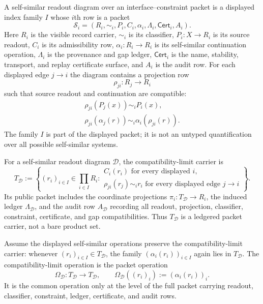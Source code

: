 \begin{definition}
\label{def:self-similar-readout-diagram}
A self-similar readout diagram over an interface--constraint packet is a
displayed index family $I$ whose $i$th row is a packet
$$
\mathcal S_i=(R_i,\sim_i,P_i,C_i,\alpha_i,\Lambda_i,\mathsf{Cert}_i,A_i).
$$
Here $R_i$ is the visible record carrier, $\sim_i$ is its classifier,
$P_i:X\to R_i$ is its source readout, $C_i$ is its admissibility row,
$\alpha_i:R_i\to R_i$ is its self-similar continuation operation,
$\Lambda_i$ is the provenance and gap ledger, $\mathsf{Cert}_i$ is the
name, stability, transport, and replay certificate surface, and $A_i$ is
the audit row. For each displayed edge $j\to i$ the diagram contains a
projection row
$$
\rho_{ji}:R_j\to R_i
$$
such that source readout and continuation are compatible:
$$
\begin{gathered}
\rho_{ji}(P_j(x))\sim_i P_i(x),\\
\rho_{ji}(\alpha_j(r))\sim_i \alpha_i(\rho_{ji}(r)).
\end{gathered}
$$
The family $I$ is part of the displayed packet; it is not an untyped
quantification over all possible self-similar systems.
\end{definition}

\begin{definition}
\label{def:compatibility-limit-carrier}
For a self-similar readout diagram $\mathcal D$, the compatibility-limit
carrier is
$$
T_{\mathcal D}
:=
\left\{(r_i)_{i\in I}\in\prod_{i\in I}R_i:
\begin{gathered}
C_i(r_i)\text{ for every displayed }i,\\
\rho_{ji}(r_j)\sim_i r_i\text{ for every displayed edge }j\to i
\end{gathered}
\right\}.
$$
Its public packet includes the coordinate projections
$\pi_i:T_{\mathcal D}\to R_i$, the induced ledger
$\Lambda_{\mathcal D}$, and the audit row $A_{\mathcal D}$ recording all
readout, projection, classifier, constraint, certificate, and gap
compatibilities. Thus $T_{\mathcal D}$ is a ledgered packet carrier, not a
bare product set.
\end{definition}

\begin{definition}
\label{def:compatibility-limit-operation}
Assume the displayed self-similar operations preserve the
compatibility-limit carrier: whenever $(r_i)_{i\in I}\in T_{\mathcal D}$,
the family $(\alpha_i(r_i))_{i\in I}$ again lies in $T_{\mathcal D}$. The
compatibility-limit operation is the packet operation
$$
\Omega_{\mathcal D}:T_{\mathcal D}\to T_{\mathcal D},
\qquad
\Omega_{\mathcal D}((r_i)_i):=(\alpha_i(r_i))_i.
$$
It is the common operation only at the level of the full packet carrying
readout, classifier, constraint, ledger, certificate, and audit rows.
\end{definition}

